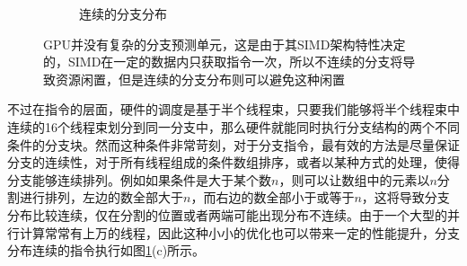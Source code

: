 \begin{figure}
\begin{fullwidth}
\begin{subfigure}[b]{0.51\thewidth}
		\caption{连续的分支分布}
	\end{subfigure}
\caption{GPU并没有复杂的分支预测单元，这是由于其SIMD架构特性决定的，SIMD在一定的数据内只获取指令一次，所以不连续的分支将导致资源闲置，但是连续的分支分布则可以避免这种闲置}
\label{f:rp-branching}
\end{fullwidth}
\end{figure}

不过在指令的层面，硬件的调度是基于半个线程束，只要我们能够将半个线程束中连续的16个线程束划分到同一分支中，那么硬件就能同时执行分支结构的两个不同条件的分支块。然而这种条件非常苛刻，对于分支指令，最有效的方法是尽量保证分支的连续性，对于所有线程组成的条件数组排序，或者以某种方式的处理，使得分支能够连续排列。例如如果条件是大于某个数$n$，则可以让数组中的元素以$n$分割进行排列，左边的数全部大于$n$，而右边的数全部小于或等于$n$，这将导致分支分布比较连续，仅在分割的位置或者两端可能出现分布不连续。由于一个大型的并行计算常常有上万的线程，因此这种小小的优化也可以带来一定的性能提升，分支分布连续的指令执行如图\ref{f:rp-branching}(c)所示。

